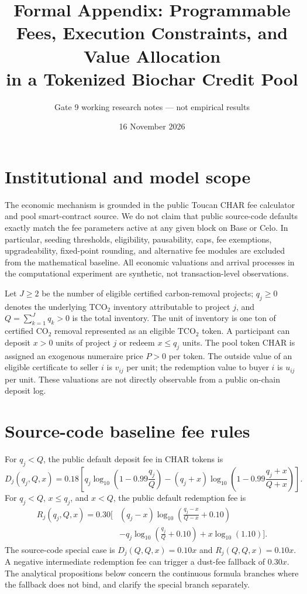 \documentclass[11pt]{article}
\title{Formal Appendix: Programmable Fees, Execution Constraints, and Value Allocation\\in a Tokenized Biochar Credit Pool}
\author{Gate 9 working research notes --- not empirical results}
\date{16 November 2026}
\begin{document}
\maketitle

\section{Institutional and model scope}
The economic mechanism is grounded in the public Toucan CHAR fee calculator and pool smart-contract source. We do not claim that public source-code defaults exactly match the fee parameters active at any given block on Base or Celo. In particular, seeding thresholds, eligibility, pausability, caps, fee exemptions, upgradeability, fixed-point rounding, and alternative fee modules are excluded from the mathematical baseline. All economic valuations and arrival processes in the computational experiment are synthetic, not transaction-level observations.

Let $J\ge2$ be the number of eligible certified carbon-removal projects; $q_j\ge0$ denotes the underlying TCO$_2$ inventory attributable to project $j$, and $Q=\sum_{k=1}^Jq_k>0$ is the total inventory. The unit of inventory is one ton of certified CO$_2$ removal represented as an eligible TCO$_2$ token. A participant can deposit $x>0$ units of project $j$ or redeem $x\le q_j$ units. The pool token CHAR is assigned an exogenous numeraire price $P>0$ per token. The outside value of an eligible certificate to seller $i$ is $v_{ij}$ per unit; the redemption value to buyer $i$ is $u_{ij}$ per unit. These valuations are not directly observable from a public on-chain deposit log.

\section{Source-code baseline fee rules}
For $q_j<Q$, the public default deposit fee in CHAR tokens is
\begin{equation}
\label{eq:deposit}
D_j(q_j,Q,x)=0.18\left[
q_j\log_{10}\!\left(1-0.99\frac{q_j}{Q}\right)
-(q_j+x)\log_{10}\!\left(1-0.99\frac{q_j+x}{Q+x}\right)
\right].
\end{equation}
For $q_j<Q$, $x\le q_j$, and $x<Q$, the public default redemption fee is
\begin{equation}
\label{eq:redeem}
\begin{aligned}
R_j(q_j,Q,x)=0.30\bigg[&(q_j-x)\log_{10}\!\left(\frac{q_j-x}{Q-x}+0.10\right)\\
&-q_j\log_{10}\!\left(\frac{q_j}{Q}+0.10\right)
+x\log_{10}(1.10)\bigg].
\end{aligned}
\end{equation}
The source-code special case is $D_j(Q,Q,x)=0.10x$ and $R_j(Q,Q,x)=0.10x$. A negative intermediate redemption fee can trigger a dust-fee fallback of $0.30x$. The analytical propositions below concern the continuous formula branches where the fallback does not bind, and clarify the special branch separately.
\end{document}
